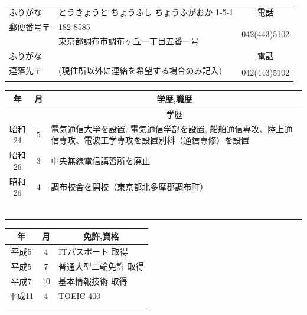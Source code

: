 \documentclass[a4j, 11pt]{jarticle}
\begin{document}
\begin{table}[t]
{\begin{tabular}{|l|c|c|c|c|c|}
   ふりがな & \multicolumn{4}{|l|}{とうきょうと ちょうふし ちょうふがおか 1-5-1} & 電話 \\ \cline{1-5}

   郵便番号〒 & \multicolumn{4}{|l|}{182-8585} & \multirow{2}{*}{042(443)5102}\\ 
     & \multicolumn{4}{l|}{東京都調布市調布ヶ丘一丁目五番一号} & \\ \hline

   ふりがな & \multicolumn{4}{|l|}{} & 電話 \\ \cline{1-5}
   連落先〒 & \multicolumn{4}{|l|}{(現住所以外に連絡を希望する場合のみ記入)} & \multirow{2}{*}{042(443)5102} \\
   & \multicolumn{4}{|l|}{} & \\
   \hline
  \end{tabular}
}

\end{table}



\begin{table}[h]
 \begin{tabular}{|c|c|p{35em}|}
  \hline
  年& 月& \multicolumn{1}{|c|}{学歴,職歴}\\ \hline \hline
  & & \multicolumn{1}{|c|}{学歴} \\ \hline
  昭和24& 5&電気通信大学を設置, 電気通信学部を設置, 船舶通信専攻、陸上通信専攻、電波工学専攻を設置別科（通信専修）を設置 \\ \hline
  昭和26& 3&中央無線電信講習所を廃止 \\ \hline
  昭和26& 4&調布校舎を開校（東京都北多摩郡調布町） \\ \hline
  & & \\ \hline
  & & \\ \hline
  & & \\ \hline
  & & \\ \hline
  & & \\ \hline
  & & \\ \hline

 \end{tabular}
\end{table}
\begin{table}[h]
 \begin{tabular}{|c|c|p{35em}|}
  \hline
  年& 月& \multicolumn{1}{|c|}{免許,資格}\\ \hline \hline
  平成5& 4& ITパスポート 取得\\ \hline
  平成5& 7& 普通大型二輪免許 取得 \\ \hline
  平成7& 10& 基本情報技術 取得\\ \hline
  平成11& 4& TOEIC 400\\ \hline
  & & \\ \hline
  & & \\ \hline

 \end{tabular}
\end{table}
\end{document}
